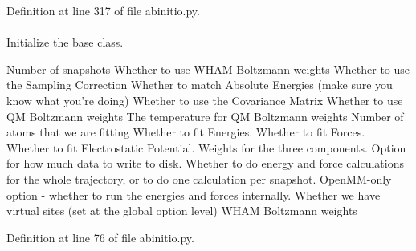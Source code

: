 \-Definition at line 317 of file abinitio.\-py.

\hypertarget{classforcebalance_1_1abinitio_1_1AbInitio_ae5c60f421336c2ecb716be16b8d51fdf}{
\paragraph[{whamboltz\-\_\-wts}]{}}\label{classforcebalance_1_1abinitio_1_1AbInitio_ae5c60f421336c2ecb716be16b8d51fdf}


\-Initialize the base class. 

\-Number of snapshots \-Whether to use \-W\-H\-A\-M \-Boltzmann weights \-Whether to use the \-Sampling \-Correction \-Whether to match \-Absolute \-Energies (make sure you know what you're doing) \-Whether to use the \-Covariance \-Matrix \-Whether to use \-Q\-M \-Boltzmann weights \-The temperature for \-Q\-M \-Boltzmann weights \-Number of atoms that we are fitting \-Whether to fit \-Energies. \-Whether to fit \-Forces. \-Whether to fit \-Electrostatic \-Potential. \-Weights for the three components. \-Option for how much data to write to disk. \-Whether to do energy and force calculations for the whole trajectory, or to do one calculation per snapshot. \-Open\-M\-M-\/only option -\/ whether to run the energies and forces internally. \-Whether we have virtual sites (set at the global option level) \-W\-H\-A\-M \-Boltzmann weights 

\-Definition at line 76 of file abinitio.\-py.

\hypertarget{classforcebalance_1_1target_1_1Target_ad4cd0ab38d8fc97d3e7a6e22ce130a16}{
\paragraph[{xct}]{}}\label{classforcebalance_1_1target_1_1Target_ad4cd0ab38d8fc97d3e7a6e22ce130a16}



